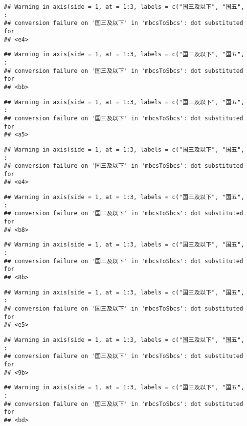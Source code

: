 \documentclass[]{article}
\begin{document}
\begin{verbatim}
## Warning in axis(side = 1, at = 1:3, labels = c("国三及以下", "国五", :
## conversion failure on '国三及以下' in 'mbcsToSbcs': dot substituted for
## <e4>
\end{verbatim}

\begin{verbatim}
## Warning in axis(side = 1, at = 1:3, labels = c("国三及以下", "国五", :
## conversion failure on '国三及以下' in 'mbcsToSbcs': dot substituted for
## <bb>
\end{verbatim}

\begin{verbatim}
## Warning in axis(side = 1, at = 1:3, labels = c("国三及以下", "国五", :
## conversion failure on '国三及以下' in 'mbcsToSbcs': dot substituted for
## <a5>
\end{verbatim}

\begin{verbatim}
## Warning in axis(side = 1, at = 1:3, labels = c("国三及以下", "国五", :
## conversion failure on '国三及以下' in 'mbcsToSbcs': dot substituted for
## <e4>
\end{verbatim}

\begin{verbatim}
## Warning in axis(side = 1, at = 1:3, labels = c("国三及以下", "国五", :
## conversion failure on '国三及以下' in 'mbcsToSbcs': dot substituted for
## <b8>
\end{verbatim}

\begin{verbatim}
## Warning in axis(side = 1, at = 1:3, labels = c("国三及以下", "国五", :
## conversion failure on '国三及以下' in 'mbcsToSbcs': dot substituted for
## <8b>
\end{verbatim}

\begin{verbatim}
## Warning in axis(side = 1, at = 1:3, labels = c("国三及以下", "国五", :
## conversion failure on '国三及以下' in 'mbcsToSbcs': dot substituted for
## <e5>
\end{verbatim}

\begin{verbatim}
## Warning in axis(side = 1, at = 1:3, labels = c("国三及以下", "国五", :
## conversion failure on '国三及以下' in 'mbcsToSbcs': dot substituted for
## <9b>
\end{verbatim}

\begin{verbatim}
## Warning in axis(side = 1, at = 1:3, labels = c("国三及以下", "国五", :
## conversion failure on '国三及以下' in 'mbcsToSbcs': dot substituted for
## <bd>
\end{verbatim}
\end{document}
